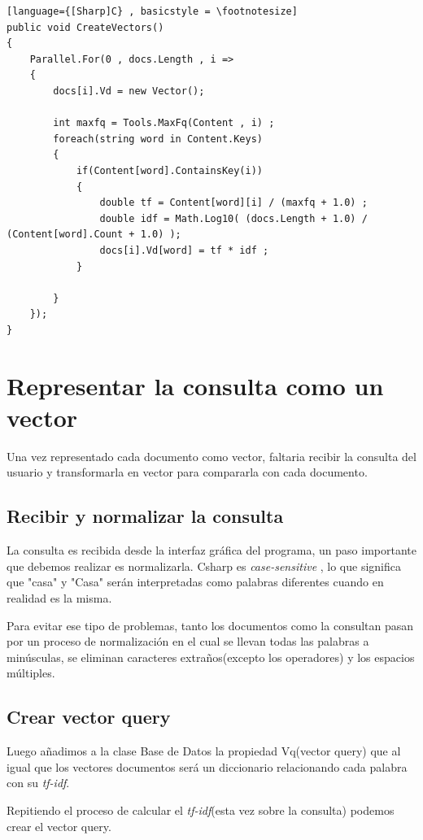 \documentclass{article}
\begin{document}
\newpage

\begin{lstlisting}[language={[Sharp]C} , basicstyle = \footnotesize]
public void CreateVectors()
{
    Parallel.For(0 , docs.Length , i =>
    {
        docs[i].Vd = new Vector();

        int maxfq = Tools.MaxFq(Content , i) ; 
        foreach(string word in Content.Keys)
        {
            if(Content[word].ContainsKey(i))
            {
                double tf = Content[word][i] / (maxfq + 1.0) ;
                double idf = Math.Log10( (docs.Length + 1.0) / (Content[word].Count + 1.0) );
                docs[i].Vd[word] = tf * idf ;                
            }
                
        }
    });
}
\end{lstlisting}

\section{Representar la consulta como un vector}
Una vez representado cada documento como vector, faltaria recibir la consulta del usuario y transformarla en vector para
compararla con cada documento.


\subsection{Recibir y normalizar la consulta}
La consulta es recibida desde la interfaz gráfica del programa, un paso importante que debemos realizar es normalizarla.
Csharp es \textit{case-sensitive} , lo que significa que "casa" y "Casa" serán interpretadas como palabras diferentes cuando
en realidad es la misma.

Para evitar ese tipo de problemas, tanto los documentos como la consultan pasan por un proceso de normalización en el cual
se llevan todas las palabras a minúsculas, se eliminan caracteres extraños(excepto los operadores) y los espacios múltiples.

\subsection{Crear vector query}
Luego añadimos a la clase Base de Datos la propiedad Vq(vector query) que al igual que los vectores documentos será un diccionario
relacionando cada palabra con su \textit{tf-idf}.

Repitiendo el proceso de calcular el \textit{tf-idf}(esta vez sobre la consulta) podemos crear el vector query.
\end{document}
